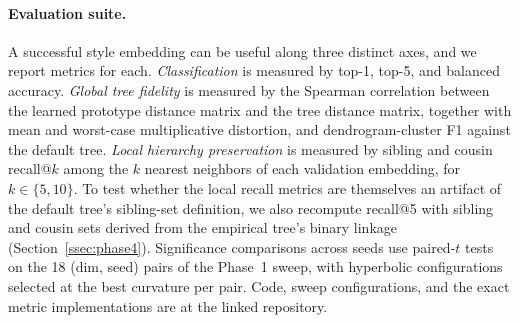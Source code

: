\paragraph{Evaluation suite.} A successful style embedding can be
useful along three distinct axes, and we report metrics for each.
\emph{Classification} is measured by top-1, top-5, and balanced
accuracy. \emph{Global tree fidelity} is measured by the Spearman
correlation between the learned prototype distance matrix and the
tree distance matrix, together with mean and worst-case
multiplicative distortion, and dendrogram-cluster F1 against the
default tree. \emph{Local hierarchy preservation} is measured by
sibling and cousin recall@$k$ among the $k$ nearest neighbors of
each validation embedding, for $k \in \{5, 10\}$. To test whether
the local recall metrics are themselves an artifact of the default
tree's sibling-set definition, we also recompute recall@5 with
sibling and cousin sets derived from the empirical tree's binary
linkage (Section~\ref{ssec:phase4}). Significance comparisons across
seeds use paired-$t$ tests on the 18 (dim, seed) pairs of the
Phase~1 sweep, with hyperbolic configurations selected at the best
curvature per pair. Code, sweep configurations, and the exact metric
implementations are at the linked repository.
